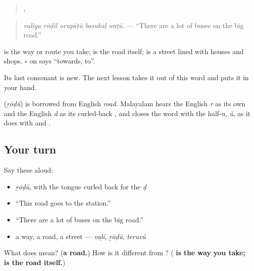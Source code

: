\begin{quote}
\textbf{    .}
\end{quote}

\begin{quote}
\emph{valiya ṟōḍil orupāṭŭ basukaḷ uṇṭŭ.} — \textquotedblleft{}There are a lot of buses on the big road.\textquotedblright{}
\end{quote}

\textbf{} is the way or route you take; \textbf{} is the road itself; \textbf{} is a street lined with houses and shops. \textbf{-} on \textbf{} says \textquotedblleft{}towards, to\textquotedblright{}.

Its last consonant is new. The next lesson takes it out of this word and puts it in your hand.

\begin{cousinweb}
\textbf{} (\emph{ṟōḍŭ}) is borrowed from English \emph{road}. Malayalam hears the English \emph{r} as its own \textbf{} and the English \emph{d} as its curled-back \textbf{}, and closes the word with the half-u, \emph{ŭ}, as it does with \textbf{} and \textbf{}.
\end{cousinweb}

\subsection*{Your turn}
Say these aloud:

\begin{itemize}
\raggedright
  \item \emph{ṟōḍŭ}, with the tongue curled back for the \emph{ḍ}
  \item \textquotedblleft{}This road goes to the station.\textquotedblright{}
  \item \textquotedblleft{}There are a lot of buses on the big road.\textquotedblright{}
  \item a way, a road, a street — \emph{vaḻi}, \emph{ṟōḍŭ}, \emph{teruvŭ}
\end{itemize}

\begin{tcolorbox}[breakable,colback=teal!4,colframe=teal!35!black,title={Before you move on}]
What does \textbf{} mean? (\textbf{a road.}) How is it different from \textbf{}? (\textbf{ is the way you take;  is the road itself.})
\end{tcolorbox}
